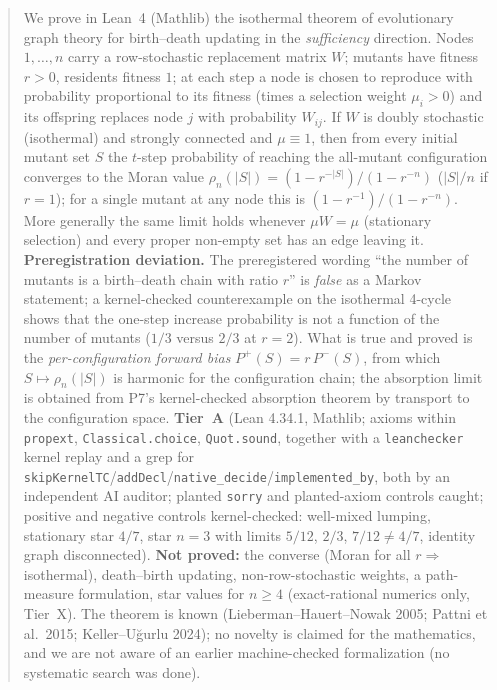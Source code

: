 \documentclass[11pt]{article}
\newcommand{\lean}[1]{\texttt{#1}}
\begin{document}
\begin{abstract}
We prove in Lean~4 (Mathlib) the isothermal theorem of evolutionary graph theory for birth--death updating in the \emph{sufficiency} direction.
Nodes $1,\dots,n$ carry a row-stochastic replacement matrix $W$; mutants have fitness $r>0$, residents fitness $1$; at each step a node is chosen to
reproduce with probability proportional to its fitness (times a selection weight $\mu_i>0$) and its offspring replaces node $j$ with probability $W_{ij}$.
If $W$ is doubly stochastic (isothermal) and strongly connected and $\mu\equiv1$, then from every initial mutant set $S$ the $t$-step probability of
reaching the all-mutant configuration converges to the Moran value $\rho_n(|S|)=(1-r^{-|S|})/(1-r^{-n})$ ($|S|/n$ if $r=1$); for a single mutant at any node this is
$(1-r^{-1})/(1-r^{-n})$. More generally the same limit holds whenever $\mu W=\mu$ (stationary selection) and every proper non-empty set has an edge leaving it.
\textbf{Preregistration deviation.} The preregistered wording ``the number of mutants is a birth--death chain with ratio $r$'' is \emph{false} as a Markov statement;
a kernel-checked counterexample on the isothermal 4-cycle shows that the one-step increase probability is not a function of the number of mutants
($1/3$ versus $2/3$ at $r=2$). What is true and proved is the \emph{per-configuration forward bias} $P^{+}(S)=r\,P^{-}(S)$, from which $S\mapsto\rho_n(|S|)$ is
harmonic for the configuration chain; the absorption limit is obtained from P7's kernel-checked absorption theorem by transport to the configuration space.
\textbf{Tier~A} (Lean 4.34.1, Mathlib; axioms within \lean{propext}, \lean{Classical.choice}, \lean{Quot.sound}, together with a \lean{leanchecker} kernel replay and a grep for \lean{skipKernelTC}/\lean{addDecl}/\lean{native\_decide}/\lean{implemented\_by}, both by an independent AI auditor; planted \lean{sorry} and planted-axiom controls caught;
positive and negative controls kernel-checked: well-mixed lumping, stationary star $4/7$, star $n=3$ with limits $5/12$, $2/3$, $7/12\neq 4/7$, identity graph disconnected).
\textbf{Not proved:} the converse (Moran for all $r\Rightarrow$ isothermal), death--birth updating, non-row-stochastic weights, a path-measure formulation,
star values for $n\ge4$ (exact-rational numerics only, Tier~X). The theorem is known (Lieberman--Hauert--Nowak 2005; Pattni et al.\ 2015; Keller--U\u{g}urlu 2024); no novelty is
claimed for the mathematics, and we are not aware of an earlier machine-checked formalization (no systematic search was done).
\end{abstract}
\end{document}
